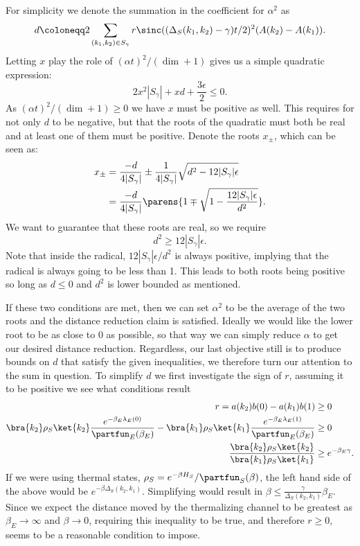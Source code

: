     For simplicity we denote the summation in the coefficient for $\alpha^2$ as
    $$d \coloneqq 2 \sum_{(k_1, k_2) \in S_{\gamma}} r \sinc((\Delta_S(k_1, k_2) - \gamma) t/2)^2 (A(k_2) - A(k_1)).$$
    Letting $x$ play the role of $(\alpha t)^2 / (\dim + 1)$ gives us a simple quadratic expression:
    \begin{equation}
        2 x^2 |S_{\gamma}| + x d + \frac{3 \epsilon}{2} \leq 0.
    \end{equation}
    As $(\alpha t)^2 / (\dim + 1) \geq 0$ we have $x$ must be positive as well. This requires for not only $d$ to be negative, but that the roots of the quadratic must both be real and at least one of them must be positive. Denote the roots $x_{\pm}$, which can be seen as:
    \begin{align}
        x_{\pm} &= \frac{-d}{4 |S_{\gamma}|} \pm \frac{1}{4 |S_{\gamma}|} \sqrt{d^2 - 12 |S_{\gamma}| \epsilon} \\
        &= \frac{-d}{4 |S_{\gamma}|} \parens{1 \mp \sqrt{1 - \frac{12 |S_{\gamma}| \epsilon}{d^2}}}.
    \end{align}
    We want to guarantee that these roots are real, so we require 
    \begin{equation}
        d^2 \geq 12 |S_{\gamma}| \epsilon. \label{eq:d_squared_epsilon_bound}
    \end{equation}
    Note that inside the radical, $12  |S_{\gamma}| \epsilon / d^2$ is always positive, implying that the radical is always going to be less than 1. This leads to both roots being positive so long as $d \leq 0$ and $d^2$ is lower bounded as mentioned.
    
    If these two conditions are met, then we can set $\alpha^2$ to be the average of the two roots and the distance reduction claim is satisfied. Ideally we would like the lower root to be as close to 0 as possible, so that way we can simply reduce $\alpha$ to get our desired distance reduction. Regardless, our last objective still is to produce bounds on $d$ that satisfy the given inequalities, we therefore turn our attention to the sum in question. To simplify $d$ we first investigate the sign of $r$, assuming it to be positive we see what conditions result
    \begin{align}
        r = a(k_2) b(0) - a(k_1) b(1) &\geq 0 \\
        \bra{k_2} \rho_S \ket{k_2} \frac{e^{-\beta_E \lambda_E(0)}}{\partfun_E(\beta_E)} - \bra{k_1} \rho_S \ket{k_1} \frac{e^{-\beta_E \lambda_E(1)}}{\partfun_E(\beta_E)} &\geq 0 \\
        \frac{\bra{k_2} \rho_S \ket{k_2}}{\bra{k_1} \rho_S \ket{k_1}} &\geq e^{-\beta_E \gamma}. \label{eq:bound_on_rho_s_for_r}
    \end{align}
    If we were using thermal states, $\rho_S = e^{-\beta H_S} / \partfun_S(\beta)$, the left hand side of the above would be $e^{-\beta \Delta_S(k_2, k_1)}$. Simplifying would result in $\beta \leq \frac{\gamma}{\Delta_S(k_2, k_1)} \beta_E$. Since we expect the distance moved by the thermalizing channel to be greatest as $\beta_E \to \infty$ and $\beta \to 0$, requiring this inequality to be true, and therefore $r \geq 0$, seems to be a reasonable condition to impose.
    
